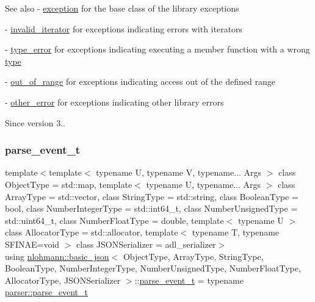 \begin{DoxySeeAlso}{See also}
-\/ \mbox{\hyperlink{classnlohmann_1_1basic__json_a9a0aced019cb1d65bb49703406c84970}{exception}} for the base class of the library exceptions 

-\/ \mbox{\hyperlink{classnlohmann_1_1basic__json_ac13d32f7cbd02d616e71d8dc30dadcbf}{invalid\+\_\+iterator}} for exceptions indicating errors with iterators 

-\/ \mbox{\hyperlink{classnlohmann_1_1basic__json_a4010e8e268fefd86da773c10318f2902}{type\+\_\+error}} for exceptions indicating executing a member function with a wrong \mbox{\hyperlink{classnlohmann_1_1basic__json_a2b2d781d7f2a4ee41bc0016e931cadf7}{type}} 

-\/ \mbox{\hyperlink{classnlohmann_1_1basic__json_a28f7c2f087274a0012eb7a2333ee1580}{out\+\_\+of\+\_\+range}} for exceptions indicating access out of the defined range 

-\/ \mbox{\hyperlink{classnlohmann_1_1basic__json_a3333a5a8714912adda33a35b369f7b3d}{other\+\_\+error}} for exceptions indicating other library errors
\end{DoxySeeAlso}
\begin{DoxySince}{Since}
version 3.. 
\end{DoxySince}
\mbox{\label{classnlohmann_1_1basic__json_aaceba2e4cf75fc983bb75c78c8742e65}} 
\subsubsection{\texorpdfstring{parse\+\_\+event\+\_\+t}{parse\_event\_t}}
{\footnotesize\ttfamily template$<$template$<$ typename U, typename V, typename... Args $>$ class Object\+Type = std\+::map, template$<$ typename U, typename... Args $>$ class Array\+Type = std\+::vector, class String\+Type  = std\+::string, class Boolean\+Type  = bool, class Number\+Integer\+Type  = std\+::int64\+\_\+t, class Number\+Unsigned\+Type  = std\+::uint64\+\_\+t, class Number\+Float\+Type  = double, template$<$ typename U $>$ class Allocator\+Type = std\+::allocator, template$<$ typename T, typename S\+F\+I\+N\+A\+E=void $>$ class J\+S\+O\+N\+Serializer = adl\+\_\+serializer$>$ \\
using \mbox{\hyperlink{classnlohmann_1_1basic__json}{nlohmann\+::basic\+\_\+json}}$<$ Object\+Type, Array\+Type, String\+Type, Boolean\+Type, Number\+Integer\+Type, Number\+Unsigned\+Type, Number\+Float\+Type, Allocator\+Type, J\+S\+O\+N\+Serializer $>$\+::\mbox{\hyperlink{classnlohmann_1_1basic__json_aaceba2e4cf75fc983bb75c78c8742e65}{parse\+\_\+event\+\_\+t}} =  typename \mbox{\hyperlink{classnlohmann_1_1detail_1_1parser_a37ac88c864dda495f72cb62776b0bebe}{parser\+::parse\+\_\+event\+\_\+t}}}



